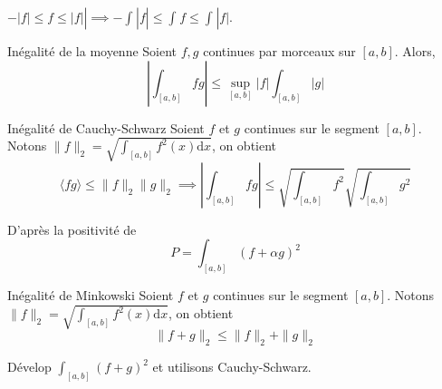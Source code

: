 \begin{myproof}{}{}
$- |f| \le f \le |f|| \implies - \int_{}^{}|f| \le \int_{}^{}f \le \int_{}^{}|f| $.
\end{myproof}

\begin{Theorem}{Inégalité de la moyenne}{}
  Soient $f,g$ continues par morceaux sur $[a,b]$. Alors, 
  \begin{equation}
    \left| \int_{[a,b]}^{} fg\right| \le \sup _{[a,b]} |f| \int_{[a,b]}^{}|g|
  \end{equation}
\end{Theorem}

\begin{Theorem}{Inégalité de Cauchy-Schwarz}{}
  Soient $f$ et $g$ continues sur le segment $[a,b]$. Notons $\|f \|_2 = \sqrt{\int_{[a,b]}^{}f ^{2}(x) \mathrm{d}x}$, on obtient 
  \begin{equation}
    \langle fg \rangle \le\| f \|_2 \| g \|_2 \implies\boxed{\left| \int_{[a,b]}^{}fg \right| \le \sqrt{\int_{[a,b]}^{}f ^{2}} \sqrt{\int_{[a,b]}^{}g ^{2}}}
  \end{equation}
\end{Theorem}

\begin{myproof}{}{}
D'après la positivité de 
\begin{equation}
  P = \int_{[a,b]}^{}(f+\alpha g) ^{2}
\end{equation}
\end{myproof}

\begin{Theorem}{Inégalité de Minkowski}{}
  Soient $f$ et $g$ continues sur le segment $[a,b]$. Notons $\|f \|_2 = \sqrt{\int_{[a,b]}^{}f ^{2}(x) \mathrm{d}x}$, on obtient 
  \begin{equation}
    \| f+g \|_2 \le \| f \|_2 + \| g \|_2
  \end{equation}
\end{Theorem}

\begin{myproof}{}{}
  Dévelop $\int_{[a,b]}^{}(f+g) ^{2}$ et utilisons Cauchy-Schwarz.
\end{myproof}




















